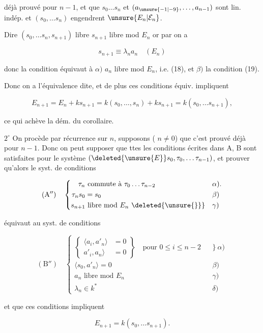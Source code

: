 
déjà prouvé pour $n-1$, et que $s_0\ldots s_n$ et $(a_{\unsure{-1|-9}},\ldots,a_{n-1})$ sont lin. indép. et $(s_0,\ldots s_n)$ engendrent $\unsure{E_n|\mathcal E_n}$. 

Dire $(s_0,\ldots s_n,s_{n+1})$ libre  $s_{n+1}$ libre mod $E_n$   or par  on a

\[s_{n+1}\equiv\lambda_n a_n\quad(E_n)\]

donc la condition équivaut à $\alpha)$ $a_n$ libre mod $E_n$, i.e. (18), et $\beta)$  la condition (19). 

Donc on a l'équivalence dite, et de plus ces  conditions équiv. impliquent

\[E_{n+1}=E_n+ks_{n+1}=k(s_0,\ldots,s_n)+ks_{n+1}=k(s_0,\ldots s_{n+1}),\]

ce qui achève la dém. du corollaire.

\textcircled{\scriptsize $2^\circ$} On procède par récurrence sur $n$, supposons ( $n\ne0$) que c'est prouvé déjà pour $n-1$. Donc on peut supposer que ttes les conditions écrites dans A, B sont satisfaites pour le système $(\deleted{\unsure{E}}s_0,\tau_0,\ldots\tau_{n-1})$,  et prouver qu'alors le syst. de conditions

\[(\mathrm A'')\quad\left\{\begin{aligned}\tau_n&\text{ commute à }\tau_0\ldots\tau_{n-2}&&\alpha).\\\tau_n s_0&=s_0 &&\beta)\\s_{n+1}&\text{ libre mod }E_n\ \deleted{\unsure{\}}}&&\gamma)\end{aligned}\right.\]

équivaut au syst. de conditions

\[(\mathrm B'')\quad\left\{\begin{aligned}\left\{\begin{aligned}\langle a_i,a'_n\rangle&=0\\ {}a'_i,a_n\rangle&=0\end{aligned}\right\}\quad\text{pour }0\leq i\leq n-2&&\big\}\ \alpha)\\ \langle s_0,a'_n\rangle=0&&\beta)\\ a_n\text{ libre mod }E_n&&\gamma)\\ \lambda_n\in k^*&&\delta)\end{aligned}\right.\]

et que ces conditions impliquent

\[E_{n+1}=k(s_0,\ldots s_{n+1}).\tag*{(20)}\]


